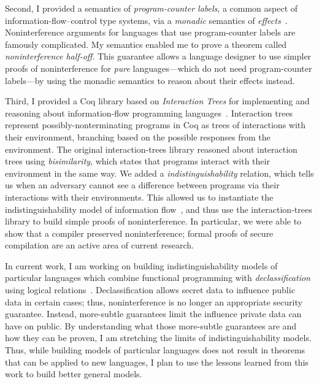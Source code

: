 \documentclass{article}
\theoremstyle{definition}
\begin{document}
Second, I provided a semantics of \emph{program-counter labels}, a common aspect of information-flow--control type systems, via a \emph{monadic} semantics of \emph{effects}~\citep{HirschC21}.
Noninterference arguments for languages that use program-counter labels are famously complicated.
My semantics enabled me to prove a theorem called \emph{noninterference half-off}.
This guarantee allows a language designer to use simpler proofs of noninterference for \emph{pure} languages---which do not need program-counter labels---by using the monadic semantics to reason about their effects instead.

Third, I provided a Coq library based on \emph{Interaction Trees} for implementing and reasoning about information-flow programming languages~\citep{SilverHHCZ22}.
Interaction trees represent possibly-nonterminating programs in Coq as trees of interactions with their environment, branching based on the possible responses from the environment.
The original interaction-trees library reasoned about interaction trees using \emph{bisimilarity}, which states that programs interact with their environment in the same way.
We added a \emph{indistinguishability} relation, which tells us when an adversary cannot see a difference between programs via their interactions with their environments.
This allowed us to instantiate the indistinguishability model of information flow~\citep{SabelfeldS99}, and thus use the interaction-trees library to build simple proofs of noninterference.
In particular, we were able to show that a compiler preserved noninterference; formal proofs of secure compilation are an active area of current research.

In current work, I am working on building indistinguishability models of particular languages which combine functional programming with \emph{declassification} using logical relations~\citep{MenzHLG22}.
Declassification allows secret data to influence public data in certain cases; thus, noninterference is no longer an appropriate security guarantee.
Instead, more-subtle guarantees limit the influence private data can have on public.
By understanding what those more-subtle guarantees are and how they can be proven, I am stretching the limits of indistinguishability models.
Thus, while building models of particular languages does not result in theorems that can be applied to new languages, I plan to use the lessons learned from this work to build better general models.
\end{document}
